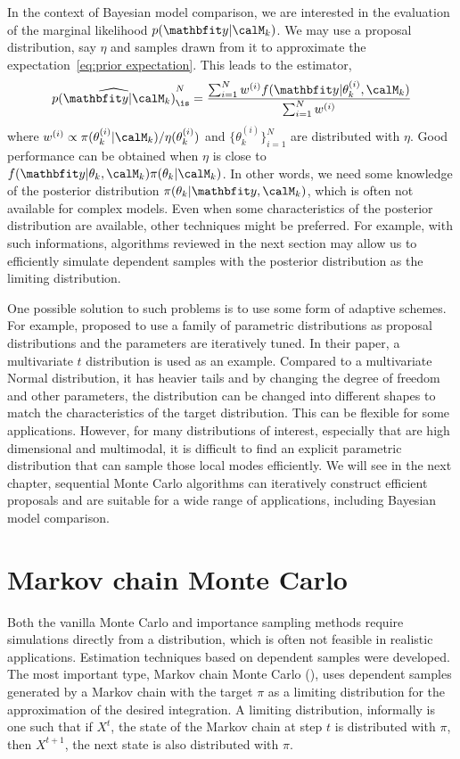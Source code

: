 In the context of Bayesian model comparison, we are interested in the
evaluation of the marginal likelihood $p(\data|\calM_k)$. We may use a
proposal distribution, say $\eta$ and samples drawn from it to approximate the
expectation~\eqref{eq:prior expectation}. This leads to the estimator,
\begin{equation}
  \widehat{p(\data|\calM_k)}_{\is}^N =
  \frac{\sum_{i=1}^N w^{(i)} f(\data|\theta_k^{(i)},\calM_k)}
  {\sum_{i=1}^N w^{(i)}}
\end{equation}
where $w^{(i)}\propto\pi(\theta_k^{(i)}|\calM_k)/\eta(\theta_k^{(i)})$ and
$\{\theta_k^{(i)}\}_{i=1}^N$ are distributed with $\eta$. Good performance
can be obtained when $\eta$ is close to
$f(\data|\theta_k,\calM_k)\pi(\theta_k|\calM_k)$. In other words, we need
some knowledge of the posterior distribution $\pi(\theta_k|\data,\calM_k)$,
which is often not available for complex models. Even when some
characteristics of the posterior distribution are available, other techniques
might be preferred. For example, with such informations, algorithms reviewed
in the next section may allow us to efficiently simulate dependent samples
with the posterior distribution as the limiting distribution.

One possible solution to such problems is to use some form of adaptive
schemes. For example, \cite{ManSuk:1992vx} proposed to use a family of
parametric distributions as proposal distributions and the parameters are
iteratively tuned. In their paper, a multivariate $t$ distribution is used as
an example. Compared to a multivariate Normal distribution, it has heavier
tails and by changing the degree of freedom and other parameters, the
distribution can be changed into different shapes to match the
characteristics of the target distribution. This can be flexible for some
applications. However, for many distributions of interest, especially that
are high dimensional and multimodal, it is difficult to find an explicit
parametric distribution that can sample those local modes efficiently. We
will see in the next chapter, sequential Monte Carlo algorithms can
iteratively construct efficient proposals and are suitable for a wide range
of applications, including Bayesian model comparison.

\section{Markov chain Monte Carlo}
\label{sec:Markov chain Monte Carlo}

Both the vanilla Monte Carlo and importance sampling methods require
simulations directly from a distribution, which is often not feasible in
realistic applications. Estimation techniques based on dependent samples were
developed. The most important type, Markov chain Monte Carlo (\mcmc), uses
dependent samples generated by a Markov chain with the target $\pi$ as a
limiting distribution for the approximation of the desired integration. A
limiting distribution, informally is one such that if $X^t$, the state of the
Markov chain at step $t$ is distributed with $\pi$, then $X^{t+1}$, the next
state is also distributed with $\pi$.

